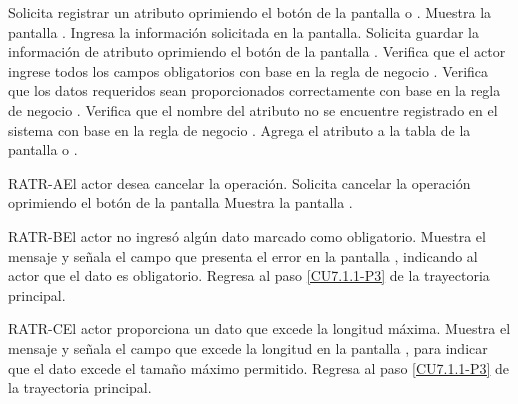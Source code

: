 	\begin{UCtrayectoria}
		\UCpaso[\UCactor] Solicita registrar un atributo oprimiendo el botón  de la pantalla  o .
		\UCpaso[\UCsist] Muestra la pantalla .
		\UCpaso[\UCactor] Ingresa la información solicitada en la pantalla. \label{CU7.1.1-P3}
		\UCpaso[\UCactor] Solicita guardar la información de atributo oprimiendo el botón  de la pantalla . 
		\UCpaso[\UCsist] Verifica que el actor ingrese todos los campos obligatorios con base en la regla de negocio . 
		\UCpaso[\UCsist] Verifica que los datos requeridos sean proporcionados correctamente con base en la regla de negocio .  
		\UCpaso[\UCsist] Verifica que el nombre del atributo no se encuentre registrado en el sistema con base en la regla de negocio . 
		\UCpaso[\UCsist] Agrega el atributo a la tabla de la pantalla  o .
	\end{UCtrayectoria}		
	
	\begin{UCtrayectoriaA}{RATR-A}{El actor desea cancelar la operación.}
		\UCpaso[\UCactor] Solicita cancelar la operación oprimiendo el botón  de la pantalla 
		\UCpaso[\UCsist] Muestra la pantalla .
	\end{UCtrayectoriaA}

	\begin{UCtrayectoriaA}{RATR-B}{El actor no ingresó algún dato marcado como obligatorio.}
		\UCpaso[\UCsist] Muestra el mensaje  y señala el campo que presenta el error en la pantalla , indicando al actor que el dato es obligatorio.
		\UCpaso Regresa al paso \ref{CU7.1.1-P3} de la trayectoria principal.
	\end{UCtrayectoriaA}

	\begin{UCtrayectoriaA}{RATR-C}{El actor proporciona un dato que excede la longitud máxima.}
		\UCpaso[\UCsist] Muestra el mensaje  y señala el campo que excede la longitud en la pantalla , para indicar que el dato excede el tamaño máximo permitido.
		\UCpaso Regresa al paso \ref{CU7.1.1-P3} de la trayectoria principal.
	\end{UCtrayectoriaA}

